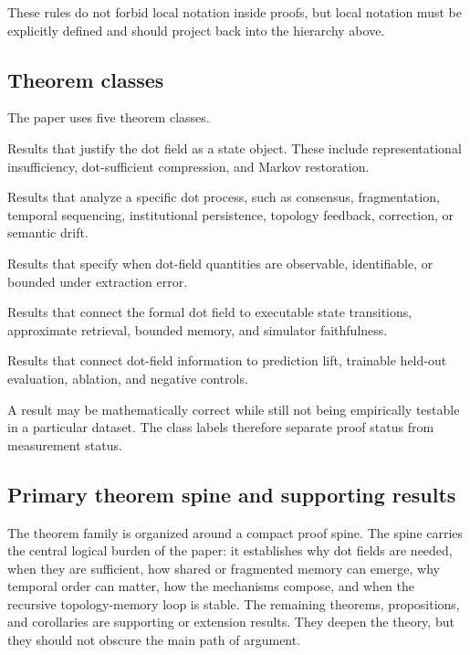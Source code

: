 \documentclass[11pt]{article}
\theoremstyle{remark}
\begin{document}
These rules do not forbid local notation inside proofs, but local notation must be explicitly defined and should project back into the hierarchy above.

\subsection{Theorem classes}\label{theorem-classes}

The paper uses five theorem classes.

\begin{description}[leftmargin=3.2cm,style=nextline]
\item[Core representation results]
Results that justify the dot field as a state object. These include representational insufficiency, dot-sufficient compression, and Markov restoration.

\item[Mechanism results]
Results that analyze a specific dot process, such as consensus, fragmentation, temporal sequencing, institutional persistence, topology feedback, correction, or semantic drift.

\item[Measurement results]
Results that specify when dot-field quantities are observable, identifiable, or bounded under extraction error.

\item[Implementation results]
Results that connect the formal dot field to executable state transitions, approximate retrieval, bounded memory, and simulator faithfulness.

\item[Validation results]
Results that connect dot-field information to prediction lift, trainable held-out evaluation, ablation, and negative controls.
\end{description}

A result may be mathematically correct while still not being empirically testable in a particular dataset. The class labels therefore separate proof status from measurement status.

\subsection{Primary theorem spine and supporting results}\label{primary-theorem-spine}

The theorem family is organized around a compact proof spine. The spine carries the central logical burden of the paper: it establishes why dot fields are needed, when they are sufficient, how shared or fragmented memory can emerge, why temporal order can matter, how the mechanisms compose, and when the recursive topology-memory loop is stable. The remaining theorems, propositions, and corollaries are supporting or extension results. They deepen the theory, but they should not obscure the main path of argument.
\end{document}
